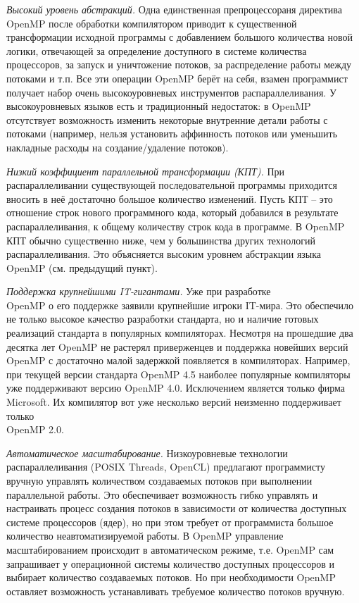 {	\par\textit{Высокий уровень абстракций.} Одна единственная препроцессораня директива OpenMP после обработки компилятором приводит к существенной трансформации исходной программы с добавлением большого количества новой логики, отвечающей за определение доступного в системе количества процессоров, за запуск и уничтожение потоков, за распределение работы между потоками и т.п. Все эти операции OpenMP берёт на себя,  взамен программист получает набор очень высокоуровневых инструментов распараллеливания. У высокоуровневых языков есть и традиционный недостаток: в OpenMP отсутствует возможность изменить некоторые внутренние детали работы с потоками (например, нельзя установить аффинность  потоков или уменьшить накладные расходы на создание/удаление потоков).
	\par\textit{Низкий коэффициент параллельной трансформации (КПТ).} При распараллеливании существующей последовательной программы приходится вносить в неё достаточно большое количество изменений. Пусть КПТ – это отношение строк нового программного кода, который добавился в результате распараллеливания, к общему количеству строк кода в программе. В OpenMP КПТ обычно существенно ниже, чем у большинства других технологий распараллеливания. Это объясняется высоким уровнем абстракции языка OpenMP (см. предыдущий пункт). 
	\par\textit{Поддержка крупнейшими  IT-гигантами.} Уже при разработке\\ OpenMP о его поддержке заявили крупнейшие игроки IT-мира. Это обеспечило не только высокое качество разработки стандарта, но и наличие готовых реализаций стандарта в популярных компиляторах. Несмотря на прошедшие два десятка лет OpenMP не растерял приверженцев и поддержка новейших версий OpenMP с достаточно малой задержкой появляется в компиляторах. Например, при текущей версии стандарта OpenMP 4.5 наиболее популярные компиляторы уже поддерживают версию OpenMP 4.0. Исключением является только фирма Microsoft. Их компилятор вот уже несколько версий неизменно поддерживает только \\OpenMP 2.0. 
	\par\textit{Автоматическое масштабирование.}  Низкоуровневые технологии распараллеливания (POSIX Threads, OpenCL) предлагают программисту вручную управлять количеством создаваемых потоков при выполнении параллельной работы. Это обеспечивает возможность гибко управлять и настраивать процесс создания потоков в зависимости от количества доступных системе процессоров (ядер), но при этом требует от программиста большое количество неавтоматизируемой работы. В OpenMP управление масштабированием происходит в автоматическом режиме, т.е. OpenMP сам запрашивает у операционной системы количество доступных процессоров и выбирает количество создаваемых потоков. Но при необходимости OpenMP оставляет возможность устанавливать требуемое количество потоков вручную.
}

